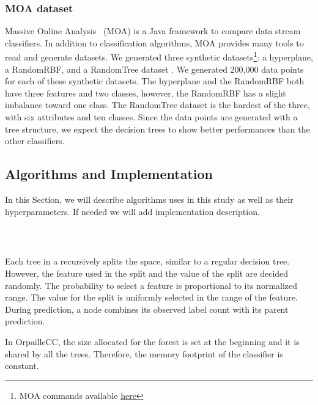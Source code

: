 \subsubsection{MOA dataset}
Massive Online Analysis~\cite{moa} (MOA) is a Java framework to compare
data stream classifiers. In addition to classification algorithms, MOA provides many
tools to read and generate datasets.
We generated three synthetic datasets\footnote{MOA commands available \href{https://github.com/azazel7/paper-benchmark/blob/e0c9a94d0d17490f7ab14293dec20b8322a6447c/Makefile\#L90}{here}}:
a hyperplane, a RandomRBF, and a RandomTree
dataset . We generated 200,000 data points
 for each of these synthetic datasets.
The hyperplane and the RandomRBF both have three features and two classes, however, the RandomRBF has a slight imbalance toward one class.
The RandomTree dataset is the hardest of the three, with six attributes and
ten classes. Since the data points are generated with a tree structure, we
expect the decision trees to show better performances than the other
classifiers.

\subsection{Algorithms and Implementation}
In this Section, we will describe algorithms uses
in this study as well as their hyperparameters. If
needed we will add implementation description.

\subsubsection{\mondrianforest~\cite{mondrian2014}}
Each tree in a \mondrianforest recursively splits
the space, similar to a regular decision tree.
However, the feature used in the split and the
value of the split are decided randomly. The
probability to select a feature is proportional to
its normalized range. The value for the split is
uniformly selected in the range of the feature.
During prediction, a node combines its observed
label count with its parent prediction.

In OrpailleCC, the size allocated for the forest
is set at the beginning and it is shared by all
the trees.  Therefore, the memory footprint of the
classifier is constant.

